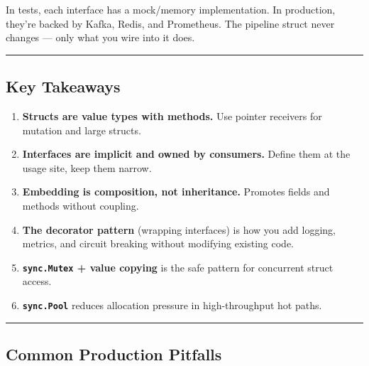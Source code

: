 \documentclass[
]{article}
\providecommand{\tightlist}{%
  \setlength{\itemsep}{0pt}\setlength{\parskip}{0pt}}
\begin{document}
In tests, each interface has a mock/memory implementation. In
production, they're backed by Kafka, Redis, and Prometheus. The pipeline
struct never changes --- only what you wire into it does.

\begin{center}\rule{0.5\linewidth}{0.5pt}\end{center}

\hypertarget{key-takeaways-2}{%
\subsection{Key Takeaways}\label{key-takeaways-2}}

\begin{enumerate}
\def\labelenumi{\arabic{enumi}.}
\tightlist
\item
  \textbf{Structs are value types with methods.} Use pointer receivers
  for mutation and large structs.
\item
  \textbf{Interfaces are implicit and owned by consumers.} Define them
  at the usage site, keep them narrow.
\item
  \textbf{Embedding is composition, not inheritance.} Promotes fields
  and methods without coupling.
\item
  \textbf{The decorator pattern} (wrapping interfaces) is how you add
  logging, metrics, and circuit breaking without modifying existing
  code.
\item
  \textbf{\texttt{sync.Mutex} + value copying} is the safe pattern for
  concurrent struct access.
\item
  \textbf{\texttt{sync.Pool}} reduces allocation pressure in
  high-throughput hot paths.
\end{enumerate}

\begin{center}\rule{0.5\linewidth}{0.5pt}\end{center}

\hypertarget{common-production-pitfalls-2}{%
\subsection{Common Production
Pitfalls}\label{common-production-pitfalls-2}}
\end{document}
